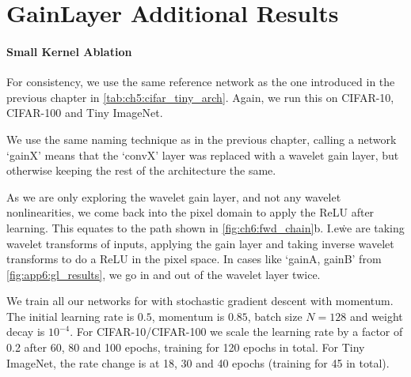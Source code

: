 \chapter{GainLayer Additional Results}\label{app:ch6:more_results}
\subsubsection{Small Kernel Ablation}
For consistency, we use the same reference network as the one introduced in the
previous chapter in \autoref{tab:ch5:cifar_tiny_arch}. Again, we run this on CIFAR-10, 
CIFAR-100 and Tiny ImageNet. 

We use the same naming technique as in the previous chapter, calling a network
`gainX' means that the `convX' layer was replaced with a wavelet gain layer, but
otherwise keeping the rest of the architecture the same. 

As we are only exploring the wavelet gain layer, and not any wavelet
nonlinearities, we come back into the pixel domain to apply the ReLU after
learning. 
This equates to the path shown in \autoref{fig:ch6:fwd_chain}b. 
I.e\. we are taking wavelet transforms of inputs, applying the gain layer and
taking inverse wavelet transforms to do a ReLU in the pixel space. In cases like
`gainA, gainB' from \autoref{fig:app6:gl_results}, we go in and out of the
wavelet layer twice.

We train all our networks for with stochastic gradient descent with momentum.
The initial learning rate is $0.5$, momentum is $0.85$, batch size $N=128$ and
weight decay is $10^{-4}$. For CIFAR-10/CIFAR-100 we scale the learning rate by
a factor of 0.2 after 60, 80 and 100 epochs, training for 120 epochs in total.
For Tiny ImageNet, the rate change is at 18, 30 and 40 epochs (training for 45 in total).

\begin{figure}[t]
  \centering
  \\
  \label{fig:app6:gl_results}
\end{figure}

